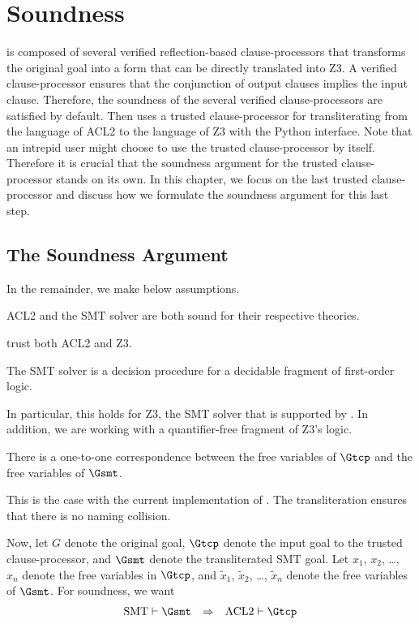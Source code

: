 \chapter{Soundness}
\label{ch:soundness}

\smtlink{} is composed of several verified reflection-based clause-processors
that transforms the original goal into a form that can be directly translated
into Z3.
A verified clause-processor ensures that the conjunction of output clauses
implies the input clause.
Therefore, the soundness of the several verified clause-processors are satisfied
by default.
Then \smtlink{} uses a trusted clause-processor for transliterating from the
language of ACL2 to the language of Z3 with the Python interface.
Note that an intrepid user might choose to use the trusted clause-processor by
itself. Therefore it is crucial that the soundness argument for the trusted
clause-processor stands on its own.
In this chapter, we focus on the last trusted clause-processor and discuss how
we formulate the soundness argument for this last step.

\section{The Soundness Argument}\label{sec:soundarg}
In the remainder, we make below assumptions.
\begin{assumption}
  ACL2 and the \acs{SMT} solver are both sound for their respective
  theories.
\end{assumption}
\smtlink{} trust both ACL2 and Z3.

\begin{assumption}
  The \acs{SMT} solver is a decision procedure for a decidable fragment of
  first-order logic.
\end{assumption}
In particular, this holds for Z3, the \acs{SMT} solver that is supported
by \smtlink{}.
In addition, we are working with a quantifier-free fragment of Z3's
logic.

\begin{assumption}
  There is a one-to-one correspondence between the free variables of $\Gtcp$
  and the free variables of $\Gsmt$.
\end{assumption}
This is the case with the current implementation of \smtlink{}. The
transliteration ensures that there is no naming collision.

Now, let $G$ denote the original goal, $\Gtcp$ denote the input goal to the
trusted clause-processor, and $\Gsmt$ denote the transliterated \acs{SMT} goal.
Let $x_1$, $x_2$, \ldots, $x_n$ denote the free variables in $\Gtcp$, and
$\tilde{x}_1$, $\tilde{x}_2$, \ldots, $\tilde{x}_n$ denote the free variables of
$\Gsmt$. For soundness, we want
\begin{equation}\label{eq:soundness}\begin{array}{rcl}
\mathrm{SMT} \vdash \Gsmt &\Rightarrow& \mathrm{ACL2} \vdash \Gtcp
\end{array}\end{equation}

